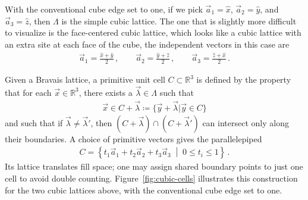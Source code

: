 \documentclass[11pt, oneside]{book}
\theoremstyle{break}
\theoremstyle{break}
\newcommand{\R}{\mathbb{R}}
\begin{document}
With the conventional cube edge set to one, if we pick $\vec{a}_1 = \hat{x}$, $\vec{a}_2 = \hat{y}$, and $\vec{a}_3 = \hat{z}$, then $\Lambda$ is the simple cubic lattice. The one that is slightly more difficult to visualize is the face-centered cubic lattice, which looks like a cubic lattice with an extra site at each face of the cube, the independent vectors in this case are 
\begin{align*}
\vec{a}_1 = \frac{\hat{x} + \hat{y}}{2} \,,\qquad
\vec{a}_2 = \frac{\hat{y} + \hat{z}}{2} \,,\qquad
\vec{a}_3 = \frac{\hat{z} + \hat{x}}{2} \,.
\end{align*}

Given a Bravais lattice, a primitive unit cell $C \subset \R^3$ is defined by the property that for each $\vec{x} \in \R^3$, there exists a $\vec{\lambda}\in \Lambda$ such that
\begin{align*}
\vec{x}\in  C + \vec{\lambda} \coloneqq \{ \vec{y} + \vec{\lambda} | \vec{y} \in C\}
\end{align*}
and such that if $\vec{\lambda} \neq \vec{\lambda}'$, then $(C+\vec{\lambda}) \cap (C + \vec{\lambda}')$ can intersect only along their boundaries.
A choice of primitive vectors gives the parallelepiped
\begin{align*}
C=\left\{t_1\vec{a}_1+t_2\vec{a}_2+t_3\vec{a}_3
\;\middle|\;0\leq t_i\leq 1\right\}\,.
\end{align*}
Its lattice translates fill space; one may assign shared boundary points to just one cell to avoid double counting. Figure~\ref{fig:cubic-cells} illustrates this construction for the two cubic lattices above, with the conventional cube edge set to one.
\end{document}
